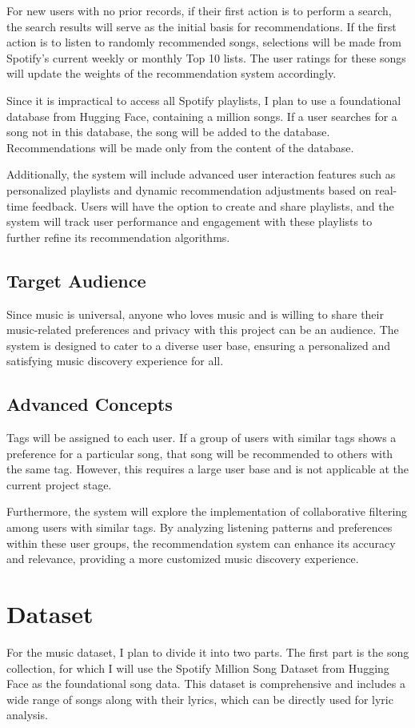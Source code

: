 \documentclass[9pt,twocolumn,twoside,lineno]{gsajnl}
\begin{document}
For new users with no prior records, if their first action is to perform a search, the search results will serve as the initial basis for recommendations. If the first action is to listen to randomly recommended songs, selections will be made from Spotify’s current weekly or monthly Top 10 lists. The user ratings for these songs will update the weights of the recommendation system accordingly.

Since it is impractical to access all Spotify playlists, I plan to use a foundational database from Hugging Face, containing a million songs. If a user searches for a song not in this database, the song will be added to the database. Recommendations will be made only from the content of the database.

Additionally, the system will include advanced user interaction features such as personalized playlists and dynamic recommendation adjustments based on real-time feedback. Users will have the option to create and share playlists, and the system will track user performance and engagement with these playlists to further refine its recommendation algorithms.

\subsection{Target Audience}
Since music is universal, anyone who loves music and is willing to share their music-related preferences and privacy with this project can be an audience. The system is designed to cater to a diverse user base, ensuring a personalized and satisfying music discovery experience for all.

\subsection{Advanced Concepts}
Tags will be assigned to each user. If a group of users with similar tags shows a preference for a particular song, that song will be recommended to others with the same tag. However, this requires a large user base and is not applicable at the current project stage.

Furthermore, the system will explore the implementation of collaborative filtering among users with similar tags. By analyzing listening patterns and preferences within these user groups, the recommendation system can enhance its accuracy and relevance, providing a more customized music discovery experience. 

\section{Dataset}
For the music dataset, I plan to divide it into two parts. The first part is the song collection, for which I will use the Spotify Million Song Dataset\citep{spotify-million-song-dataset} from Hugging Face as the foundational song data. This dataset is comprehensive and includes a wide range of songs along with their lyrics, which can be directly used for lyric analysis. 
\end{document}
